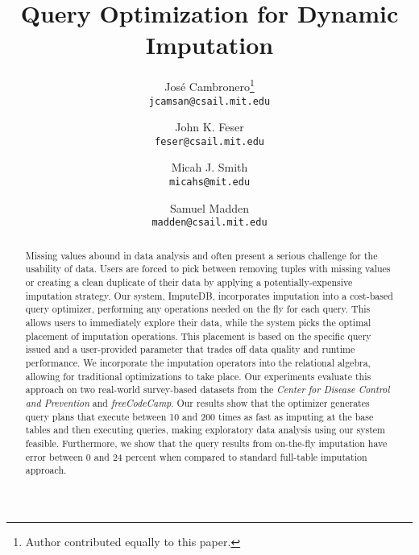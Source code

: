 \documentclass{vldb}
\title{Query Optimization for Dynamic Imputation}
\author{
  Jos\'e Cambronero\thanks{Author contributed equally to this paper.} \\
  \texttt{jcamsan@csail.mit.edu}
  \and
  John K. Feser\footnotemark[1] \\
  \texttt{feser@csail.mit.edu}
  \and
  Micah J. Smith\footnotemark[1] \\
  \texttt{micahs@mit.edu}
  \and
  Samuel Madden \\
  \texttt{madden@csail.mit.edu}}
\newcommand{\ProjectName}{ImputeDB\xspace}
\newcommand{\lowxalphazero}{10}
\newcommand{\lowsmapealphazero}{0}
\newcommand{\highxalphazeroexacs}{200}
\newcommand{\highsmapealphaoneexacs}{24}
\begin{document}
\maketitle

\begin{abstract}
Missing values abound in data analysis and often present a serious challenge for the usability of data. Users
are forced to pick between removing tuples with missing values or creating a clean duplicate of their data
by applying a potentially-expensive imputation strategy. Our system, \ProjectName{}, incorporates imputation into a cost-based query optimizer, 
performing any operations needed on the fly
for each query. This allows users to immediately explore
their data, while the system picks the optimal placement of imputation operations. This placement is based
on the specific query issued and a user-provided parameter that trades off data
quality and runtime performance. We incorporate the imputation operators into the relational algebra, allowing
for traditional optimizations to take place. Our experiments evaluate this approach on two real-world survey-based datasets
from the \textit{Center for Disease Control and Prevention} and \textit{freeCodeCamp}. Our
results show that the optimizer generates query plans that execute between \lowxalphazero{}
and \highxalphazeroexacs{} times as fast as imputing at the base tables and then executing
queries, making exploratory data analysis using our system feasible.  Furthermore, we show
that the query results from on-the-fly imputation have
error between \lowsmapealphazero{} and
\highsmapealphaoneexacs{} percent when compared to standard full-table imputation
approach.

\end{abstract}







\balance
\printbibliography
\end{document}
